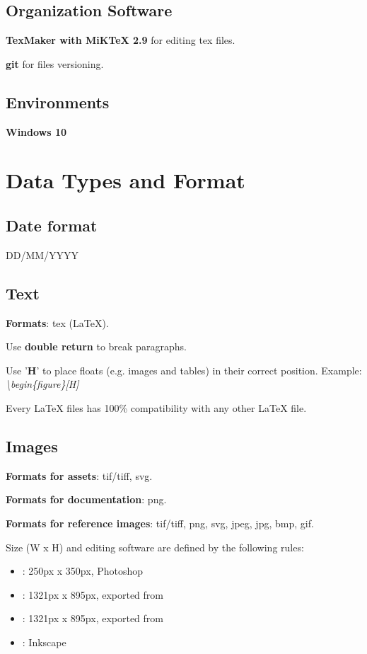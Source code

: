 \documentclass[12pt]{article}
\begin{document}
\subsection{Organization Software}
\textbf{TexMaker with MiKTeX 2.9} for editing tex files.

\textbf{git} for files versioning.

\subsection{Environments}
\textbf{Windows 10}

\section{Data Types and Format}

\subsection{Date format}
DD/MM/YYYY

\subsection{Text}
\textbf{Formats}: tex (LaTeX).


Use \textbf{double return} to break paragraphs.

Use '\textbf{H}' to place floats (e.g. images and tables) in their correct position. Example: \textit{\textbackslash{}begin\{figure\}[H]}

Every LaTeX files has 100\% compatibility with any other LaTeX file.

\subsection{Images}
\textbf{Formats for assets}: tif/tiff, svg.

\textbf{Formats for documentation}: png.

\textbf{Formats for reference images}: tif/tiff, png, svg, jpeg, jpg, bmp, gif.

Size (W x H) and editing software are defined by the following rules:
\begin{itemize}
	\item \textbf{}: 250px x 350px, Photoshop
	\item \textbf{}: 1321px x 895px, exported from 
	\item \textbf{}: 1321px x 895px, exported from 
	\item \textbf{}: Inkscape
\end{itemize}
\end{document}
